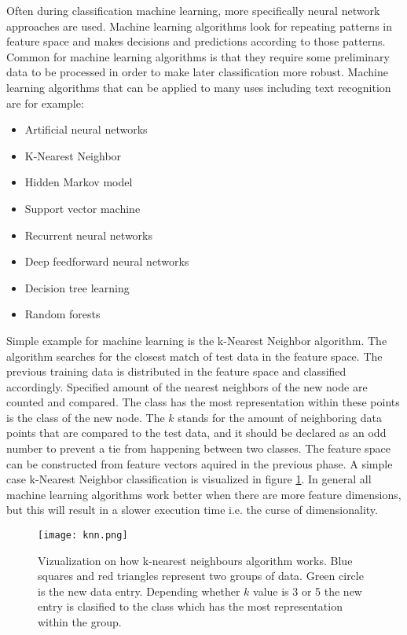 \documentclass{article}
\begin{document}
        Often during classification machine learning, more specifically neural network approaches are used. Machine learning algorithms look for repeating patterns in feature space and makes decisions and predictions according to those patterns. Common for machine learning algorithms is that they require some preliminary data to be processed in order to make later classification more robust. Machine learning algorithms that can be applied to many uses including text recognition are for example:

        \begin{itemize}
          \item Artificial neural networks
          \item K-Nearest Neighbor
          \item Hidden Markov model
          \item Support vector machine
          \item Recurrent neural networks
          \item Deep feedforward neural networks
          \item Decision tree learning
          \item Random forests  \cite{SAS}
        \end{itemize}

          Simple example for machine learning is the k-Nearest Neighbor algorithm. The algorithm searches for the closest match of test data in the feature space. The previous training data is distributed in the feature space and classified accordingly. Specified amount of the nearest neighbors of the new node are counted and compared. The class has the most representation within these points is the class of the new node. The $k$ stands for the amount of neighboring data points that are compared to the test data, and it should be declared as an odd number to prevent a tie from happening between two classes. The feature space can be constructed from feature vectors aquired in the previous phase. A simple case k-Nearest Neighbor classification is visualized in figure \ref{fig:knn}. In general all machine learning algorithms work better when there are more feature dimensions, but this will result in a slower execution time i.e. the curse of dimensionality.\cite{Beyer}

          \begin{figure}[!ht]
            \centering
            \texttt{[image: knn.png]}
            \caption{Vizualization on how k-nearest neighbours algorithm works. Blue squares
                      and red triangles represent two groups of data. Green circle is the new
                      data entry. Depending whether $k$ value is 3 or 5 the new entry is clasified
                      to the class which has the most representation within the group.\label{fig:knn} }
          \end{figure}
\end{document}
